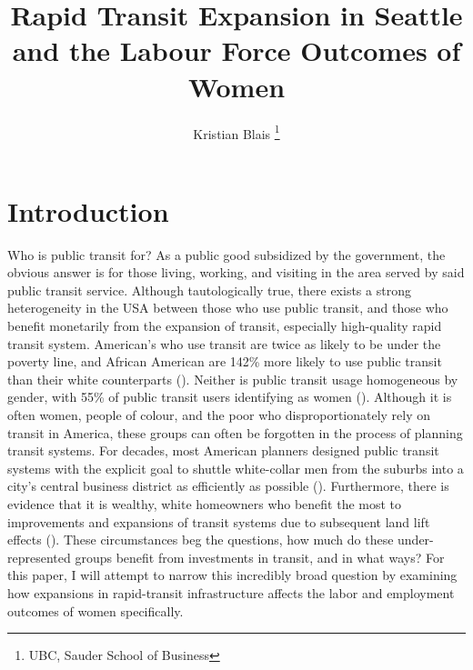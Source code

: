 \documentclass{article}
\title{\textbf{Rapid Transit Expansion in Seattle and the Labour Force Outcomes of Women}}
\author{Kristian Blais \footnote{UBC, Sauder School of Business}\\}
\date{\vspace{-8mm}}
\begin{document}
\doublespacing

\maketitle

\begin{abstract}
\end{abstract}

\newpage

\tableofcontents

\newpage

\section{Introduction}
 

Who is public transit for? As a public good subsidized by the government, the obvious answer is for those living, working, and visiting in the area served by said public transit service. Although tautologically true, there exists a strong heterogeneity in the USA between those who use public transit, and those who benefit monetarily from the expansion of transit, especially high-quality rapid transit system. American’s who use transit are twice as likely to be under the poverty line, and African American are 142\% more likely to use public transit than their white counterparts (\cite{clark_hugh_m_who_2017}). Neither is public transit usage homogeneous by gender, with 55\% of public transit users identifying as women (\cite{anderson_who_2016}). Although it is often women, people of colour, and the poor who disproportionately rely on transit in America, these groups can often be forgotten in the process of planning transit systems. For decades, most American planners designed public transit systems with the explicit goal to shuttle white-collar men from the suburbs into a city’s central business district as efficiently as possible (\cite{caroline_criado_perez_invisible_2019}). Furthermore, there is evidence that it is wealthy, white homeowners who benefit the most to improvements and expansions of transit systems due to subsequent land lift effects (\cite{chernoff_distributional_2022}). These circumstances beg the questions, how much do these under-represented groups benefit from investments in transit, and in what ways? For this paper, I will attempt to narrow this incredibly broad question by examining how expansions in rapid-transit infrastructure affects the labor and employment outcomes of women specifically.\\
\end{document}
